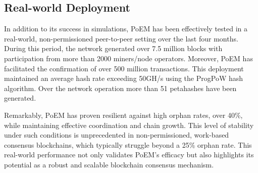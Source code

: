 \subsection{Real-world Deployment} 
In addition to
its success in simulations, PoEM has been effectively tested in a real-world,
non-permissioned peer-to-peer setting over the last four months. During this
period, the network generated over 7.5 million blocks with participation from
more than 2000 miners/node operators. Moreover, PoEM has facilitated the
confirmation of over 500 million transactions. This deployment maintained an
average hash rate exceeding 50GH/s using the ProgPoW hash algorithm. Over the
network operation more than 51 petahashes have been generated.

Remarkably, PoEM has proven resilient against high orphan rates, over 40\%,
while maintaining effective coordination and chain growth. This level of
stability under such conditions is unprecedented in non-permissioned,
work-based consensus blockchains, which typically struggle beyond a 25\% orphan
rate. This real-world performance not only validates PoEM's efficacy but also
highlights its potential as a robust and scalable blockchain consensus
mechanism.
